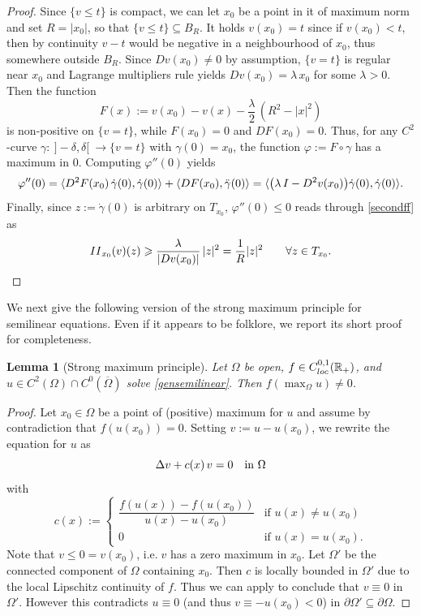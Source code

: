 \documentclass[12pt]{amsart}
\numberwithin{equation}{section}
\theoremstyle{plain}
\newtheorem{lemma}[theorem]{Lemma}
\theoremstyle{plain}
\theoremstyle{plain}
\theoremstyle{definition}
\newcommand{\R}{{\mathbb R}}
\renewcommand{\le}{\leqslant}
\renewcommand{\ge}{\geqslant}
\begin{document}
\begin{proof} 
Since $\{v\le t\}$ is compact, we can let $x_0$ be a point in it of maximum norm and set $R=|x_0|$, so that $\{v\le t\}\subseteq B_R$. 
It holds $v(x_0)=t$ since if $v(x_0)<t$, then by continuity $v-t$ would be negative in a neighbourhood of $x_0$, thus somewhere outside $B_R$. 
Since $Dv(x_0)\ne 0$ by assumption, $\{v=t\}$ is regular near $x_0$ and Lagrange multipliers rule yields
$ Dv(x_0)=\lambda\, x_0$ 
 for some $\lambda>0$. Then the function 
 \[
 F(x) := v(x_0)-v(x)-\frac{\lambda}{2}\, \left(R^2-|x|^2\right)
 \] 
 is non-positive on $\{v=t\}$, while $F(x_0)=0$ and $DF(x_0)=0$. 
Thus, for any $C^2$-curve $\gamma: \ ]-\delta, \delta[\ \to \{v=t\}$ with $\gamma(0)=x_0$, the function $\varphi:=F\circ \gamma$ has a maximum in $0$. 
Computing $\varphi''(0)$ yields 
 \[
 \varphi''(0)=\langle D^2F(x_0)\,\dot{\gamma}(0), \dot{\gamma}(0)\rangle +\langle DF(x_0), \ddot{\gamma}(0)\rangle=\langle \big(\lambda\, {\rm I}-D^2v(x_0)\big)\dot{\gamma}(0), \dot{\gamma}(0)\rangle.
 \]
Finally, since $z:=\dot{\gamma}(0)$ is arbitrary on $T_{x_0}$, $\varphi''(0)\le 0$ reads through \eqref{secondff} as
 \[
 {\rm II}_{x_0}(v)(z)\ge\frac{\lambda}{|Dv(x_0)|}\, |z|^2 = \frac{1}{R} |z|^2 \qquad \forall z\in T_{x_0}.
\vspace{-1.5em}
\]
 \end{proof}
 
We next give the following version of the strong maximum principle for semilinear equations. 
Even if it appears to be folklore, we report its short proof for completeness.
 
 \begin{lemma}[Strong maximum principle]
 \label{lem_nonzero_max}
 Let $\Omega$ be open, $f \in C^{0,1}_{\rm loc}(\R_+)$, and $u \in C^2(\Omega) \cap C^0(\overline{\Omega})$ solve \eqref{gensemilinear}.
Then $f(\max_{\Omega} u) \neq 0$. 
 \end{lemma}
 
 \begin{proof}
 Let $x_0 \in \Omega$ be a point of (positive) maximum for $u$ and 
assume by contradiction that $f(u(x_0))=0$. 
Setting $v:= u - u(x_0)$, we rewrite the equation for $u$ as
 $$
 \Delta v + c(x) \, v =0 \quad \hbox{in $\Omega$}
 $$
 with
 \[
 c(x):=
 \begin{cases}
 \dfrac{f(u(x))-f(u(x_0))}{u(x)-u(x_0)}&\text{if $u(x)\ne u(x_0)$}\\[5pt]
 0&\text{if $u(x)= u(x_0)$}.
 \end{cases}
 \]
Note that $v\leq 0 = v(x_0)$, i.e.$\;$$v$ has a zero maximum in $x_0$. 
Let $\Omega'$ be the connected component of $\Omega$ containing $x_0$. Then $c$ is locally bounded in $\Omega'$ due to the local Lipschitz continuity of $f$. 
Thus we can apply \cite[Theorem 2.1.2]{PuSe07} to conclude that $v \equiv 0$ in $\Omega'$. 
However this contradicts $u\equiv 0$ (and thus $v\equiv -u(x_0)<0$) in $\partial\Omega'\subseteq \partial\Omega$.
 \end{proof}
 
\end{document}
